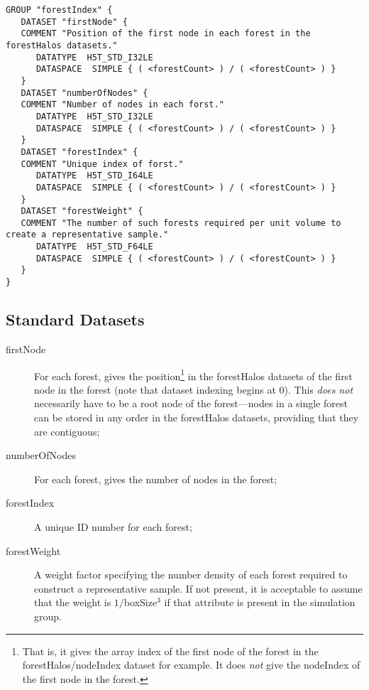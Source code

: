 \begin{verbatim}
GROUP "forestIndex" {
   DATASET "firstNode" {
   COMMENT "Position of the first node in each forest in the forestHalos datasets."
      DATATYPE  H5T_STD_I32LE
      DATASPACE  SIMPLE { ( <forestCount> ) / ( <forestCount> ) }
   }
   DATASET "numberOfNodes" {
   COMMENT "Number of nodes in each forst."
      DATATYPE  H5T_STD_I32LE
      DATASPACE  SIMPLE { ( <forestCount> ) / ( <forestCount> ) }
   }
   DATASET "forestIndex" {
   COMMENT "Unique index of forst."
      DATATYPE  H5T_STD_I64LE
      DATASPACE  SIMPLE { ( <forestCount> ) / ( <forestCount> ) }
   }
   DATASET "forestWeight" {
   COMMENT "The number of such forests required per unit volume to create a representative sample."
      DATATYPE  H5T_STD_F64LE
      DATASPACE  SIMPLE { ( <forestCount> ) / ( <forestCount> ) }
   }
}
\end{verbatim}

\subsection{Standard Datasets}

\begin{description}
 \item [{\normalfont \ttfamily firstNode}] For each forest, gives the position\footnote{That is, it gives the array index of the first node of the forest in the {\normalfont \ttfamily forestHalos/nodeIndex} dataset for example. It does \emph{not} give the {\normalfont \ttfamily nodeIndex} of the first node in the forest.} in the {\normalfont \ttfamily forestHalos} datasets of the first node in the forest (note that dataset indexing begins at 0). This \emph{does not} necessarily have to be a root node of the forest---nodes in a single forest can be stored in any order in the {\normalfont \ttfamily forestHalos} datasets, providing that they are contiguous;
 \item [{\normalfont \ttfamily numberOfNodes}] For each forest, gives the number of nodes in the forest;
 \item [{\normalfont \ttfamily forestIndex}] A unique ID number for each forest;
 \item [{\normalfont \ttfamily forestWeight}] A weight factor specifying the number density of each forest required to construct a representative sample. If not present, it is acceptable to assume that the weight is $1/${\normalfont \ttfamily boxSize}$^3$ if that attribute is present in the {\normalfont \ttfamily simulation} group.
\end{description}


